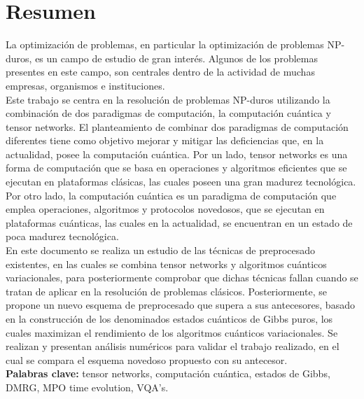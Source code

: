 \chapter{Resumen}

La optimización de problemas, en particular la optimización de problemas NP-duros, es un campo de estudio de gran interés. Algunos de los problemas presentes en este campo, son centrales dentro de la actividad de muchas empresas, organismos e instituciones. \\

Este trabajo se centra en la resolución de problemas NP-duros utilizando la combinación de dos paradigmas de computación, la computación cuántica y tensor networks. El planteamiento de combinar dos paradigmas de computación diferentes tiene como objetivo mejorar y mitigar las deficiencias que, en la actualidad, posee la computación cuántica. Por un lado, tensor networks es una forma de computación que se basa en operaciones y algoritmos eficientes que se ejecutan en plataformas clásicas, las cuales poseen una gran madurez tecnológica. Por otro lado, la computación cuántica es un paradigma de computación que emplea operaciones, algoritmos y protocolos novedosos, que se ejecutan en plataformas cuánticas, las cuales en la actualidad, se encuentran en un estado de poca madurez tecnológica. \\

En este documento se realiza un estudio de las técnicas de preprocesado existentes, en las cuales se combina tensor networks y algoritmos cuánticos variacionales, para posteriormente comprobar que dichas técnicas fallan cuando se tratan de aplicar en la resolución de problemas clásicos. Posteriormente, se propone un nuevo esquema de preprocesado que supera a sus antecesores, basado en la construcción de los denominados estados cuánticos de Gibbs puros, los cuales maximizan el rendimiento de los algoritmos cuánticos variacionales. Se realizan y presentan análisis numéricos para validar el trabajo realizado, en el cual se compara el esquema novedoso propuesto con su antecesor. \\

{\bf Palabras clave:} tensor networks, computación  cuántica, estados de Gibbs, DMRG, MPO time evolution, VQA's.